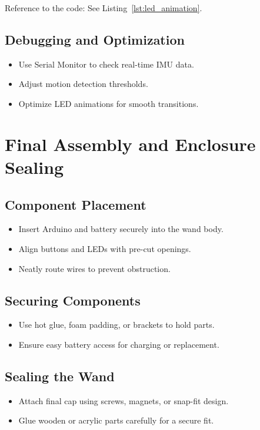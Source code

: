 Reference to the code: See Listing~\ref{lst:led_animation}.

\subsection{Debugging and Optimization}
\begin{itemize}
	\item Use Serial Monitor to check real-time IMU data.
	\item Adjust motion detection thresholds.
	\item Optimize LED animations for smooth transitions.
\end{itemize}

\section{Final Assembly and Enclosure Sealing}
\subsection{Component Placement}
\begin{itemize}
	\item Insert Arduino and battery securely into the wand body.
	\item Align buttons and LEDs with pre-cut openings.
	\item Neatly route wires to prevent obstruction.
\end{itemize}

\subsection{Securing Components}
\begin{itemize}
	\item Use hot glue, foam padding, or brackets to hold parts.
	\item Ensure easy battery access for charging or replacement.
\end{itemize}

\subsection{Sealing the Wand}
\begin{itemize}
	\item Attach final cap using screws, magnets, or snap-fit design.
	\item Glue wooden or acrylic parts carefully for a secure fit.
\end{itemize}

